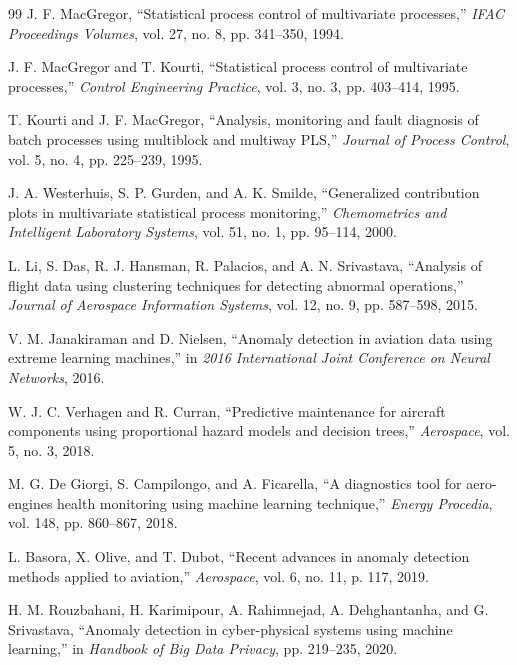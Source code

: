 \documentclass[12pt,a4paper]{report}
\begin{document}
\begin{thebibliography}{99}
		J. F. MacGregor,
		``Statistical process control of multivariate processes,''
		\emph{IFAC Proceedings Volumes}, vol. 27, no. 8, pp. 341--350, 1994.
		
		J. F. MacGregor and T. Kourti,
		``Statistical process control of multivariate processes,''
		\emph{Control Engineering Practice}, vol. 3, no. 3, pp. 403--414, 1995.
		
		T. Kourti and J. F. MacGregor,
		``Analysis, monitoring and fault diagnosis of batch processes using multiblock and multiway PLS,''
		\emph{Journal of Process Control}, vol. 5, no. 4, pp. 225--239, 1995.
		
		J. A. Westerhuis, S. P. Gurden, and A. K. Smilde,
		``Generalized contribution plots in multivariate statistical process monitoring,''
		\emph{Chemometrics and Intelligent Laboratory Systems}, vol. 51, no. 1, pp. 95--114, 2000.
		
		L. Li, S. Das, R. J. Hansman, R. Palacios, and A. N. Srivastava,
		``Analysis of flight data using clustering techniques for detecting abnormal operations,''
		\emph{Journal of Aerospace Information Systems}, vol. 12, no. 9, pp. 587--598, 2015.
		
		V. M. Janakiraman and D. Nielsen,
		``Anomaly detection in aviation data using extreme learning machines,''
		in \emph{2016 International Joint Conference on Neural Networks}, 2016.
		
		W. J. C. Verhagen and R. Curran,
		``Predictive maintenance for aircraft components using proportional hazard models and decision trees,''
		\emph{Aerospace}, vol. 5, no. 3, 2018.
		
		M. G. De Giorgi, S. Campilongo, and A. Ficarella,
		``A diagnostics tool for aero-engines health monitoring using machine learning technique,''
		\emph{Energy Procedia}, vol. 148, pp. 860--867, 2018.
		
		L. Basora, X. Olive, and T. Dubot,
		``Recent advances in anomaly detection methods applied to aviation,''
		\emph{Aerospace}, vol. 6, no. 11, p. 117, 2019.
		
		H. M. Rouzbahani, H. Karimipour, A. Rahimnejad, A. Dehghantanha, and G. Srivastava,
		``Anomaly detection in cyber-physical systems using machine learning,''
		in \emph{Handbook of Big Data Privacy}, pp. 219--235, 2020.
		

\end{thebibliography}
\end{document}
